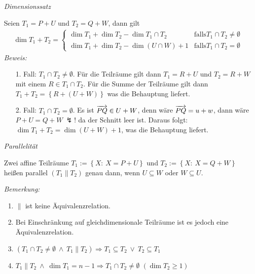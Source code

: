 \begin{mysatz}\textit{Dimensionssatz}\medskip

    Seien $T_1 = P + U$ und $T_2 = Q + W$, dann gilt
    \begin{align*}
        \dim T_1 + T_2 =
        \begin{cases}
            \dim T_1 + \dim T_2 - \dim T_1 \cap T_2 & \text{falls} T_1 \cap T_2 \neq \emptyset\\
            \dim T_1 + \dim T_2 - \dim \left( U \cap W \right) + 1 & \text{falls} T_1 \cap T_2 = \emptyset
        \end{cases}
    \end{align*}
    \textit{Beweis:}
    \begin{itemize}
        \item[1. Fall:] $T_1 \cap T_2 \neq \emptyset$.
            Für die Teilräume gilt dann $T_1 = R + U$ und $T_2 = R + W$ mit einem $R \in T_1 \cap T_2$.
            Für die Summe der Teilräume gilt dann $T_1 + T_2 = \left\{ R + \left( U + W \right) \right\}$ was die Behauptung liefert.
        \item[2. Fall:] $T_1 \cap T_2 = \emptyset$.
            Es ist $\overrightarrow{PQ} \in U + W$, denn wäre $\overrightarrow{PQ} = u + w$, dann wäre $P + U = Q + W \ \lightning!$ da der Schnitt leer ist.
            Daraus folgt: $\dim T_1 + T_2 = \dim \left( U + W \right) + 1$, was die Behauptung liefert.
    \end{itemize}
\end{mysatz}

\begin{mydef}\textit{Parallelität}\medskip

    Zwei affine Teilräume $T_1 := \left\{ X:\ X = P + U \right\}$ und $T_2 := \left\{ X:\ X = Q + W \right\}$ heißen parallel $\left( T_1 \parallel T_2 \right)$ genau dann, wenn $U \subseteq W$ oder $W \subseteq U$.
\end{mydef}
\textit{Bemerkung:}
\begin{enumerate}
    \item $\parallel$ ist keine Äquivalenzrelation.
    \item Bei Einschränkung auf gleichdimensionale Teilräume ist es jedoch eine Äquivalenzrelation.
    \item $\left( T_1 \cap T_2 \neq \emptyset \ \wedge \ T_1 \parallel T_2 \right) \Rightarrow T_1 \subseteq T_2 \ \vee \ T_2 \subseteq T_1$
    \item $T_1 \parallel T_2 \ \wedge \ \dim T_1 = n - 1 \Rightarrow T_1 \cap T_2 \neq \emptyset$ \hfill $\left( \dim T_2 \geq 1 \right)$
\end{enumerate}

